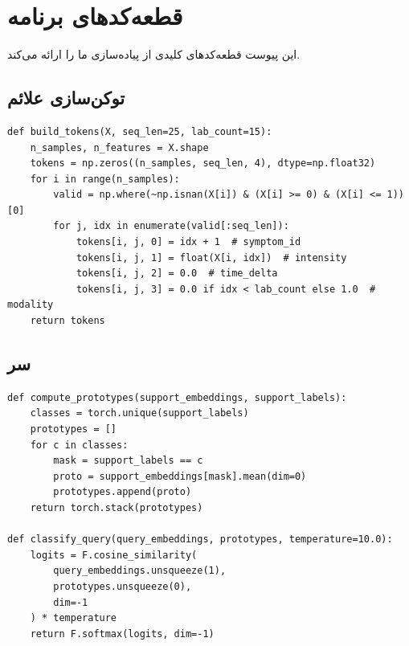 \chapter{قطعه‌کدهای برنامه}
\label{app:code}

این پیوست قطعه‌کدهای کلیدی از پیاده‌سازی ما را ارائه می‌کند.

\section{\texorpdfstring{توکن‌سازی علائم}{توکن‌سازی علائم}}

\begin{latin}\begin{lstlisting}[caption={\rl{ساخت دنباله‌ی توکن}}]
def build_tokens(X, seq_len=25, lab_count=15):
    n_samples, n_features = X.shape
    tokens = np.zeros((n_samples, seq_len, 4), dtype=np.float32)
    for i in range(n_samples):
        valid = np.where(~np.isnan(X[i]) & (X[i] >= 0) & (X[i] <= 1))[0]
        for j, idx in enumerate(valid[:seq_len]):
            tokens[i, j, 0] = idx + 1  # symptom_id
            tokens[i, j, 1] = float(X[i, idx])  # intensity
            tokens[i, j, 2] = 0.0  # time_delta
            tokens[i, j, 3] = 0.0 if idx < lab_count else 1.0  # modality
    return tokens
\end{lstlisting}\end{latin}

\section{سر }

\begin{latin}\begin{lstlisting}[caption={\rl{محاسبه‌ی \lr{prototype} و طبقه‌بندی}}]
def compute_prototypes(support_embeddings, support_labels):
    classes = torch.unique(support_labels)
    prototypes = []
    for c in classes:
        mask = support_labels == c
        proto = support_embeddings[mask].mean(dim=0)
        prototypes.append(proto)
    return torch.stack(prototypes)

def classify_query(query_embeddings, prototypes, temperature=10.0):
    logits = F.cosine_similarity(
        query_embeddings.unsqueeze(1),
        prototypes.unsqueeze(0),
        dim=-1
    ) * temperature
    return F.softmax(logits, dim=-1)
\end{lstlisting}\end{latin}

